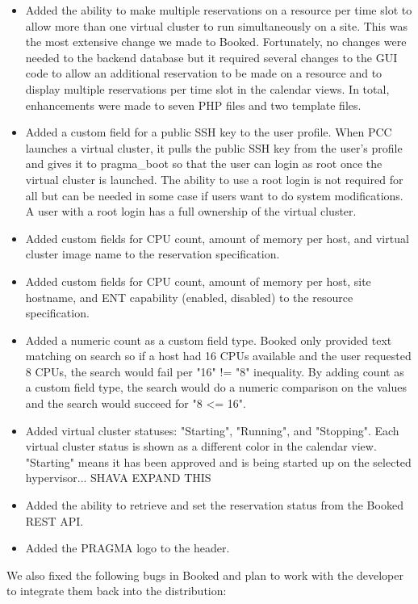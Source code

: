 \documentclass[times]{cpeauth}
\begin{document}
\begin{itemize}
\item Added the ability to make multiple reservations on a resource per time slot to allow more than one virtual cluster to run simultaneously on a site.   This was the most extensive change we made to Booked.  Fortunately, no changes were needed to the backend database but it required several changes to the GUI code to allow an additional reservation to be made on a resource and to display multiple reservations per time slot in the calendar views.  In total, enhancements were made to seven PHP files and two template files.
\item Added a custom field for a public SSH key  to the user profile.  When PCC launches a virtual cluster, it pulls the public SSH key from the user's  profile and gives it to pragma\_boot so that the user can login as root once the virtual cluster is launched.   The ability to use a root login is not required for all but can be needed in some case if users want to do system modifications. A user with a root login has a full ownership of the virtual cluster. 
\item Added custom fields for CPU count, amount of memory per host, and virtual cluster image name to the reservation specification.
\item Added custom fields for CPU count, amount of memory per host, site hostname, and ENT capability (enabled, disabled) to the resource specification.
\item Added a numeric count as a custom field type.  Booked only provided text matching on search so if a host had 16 CPUs available and the user requested 8 CPUs, the search would fail per "16" != "8" inequality.  By adding count as a custom field type, the search would do a numeric comparison on the values and the search would succeed for "8 \textless= 16".
\item Added virtual cluster statuses: "Starting", "Running", and "Stopping".  Each virtual cluster status is shown as a different color in  the calendar view.  "Starting" means it has been approved and is being started up on the selected hypervisor... SHAVA EXPAND THIS
\item Added the ability to retrieve and set the reservation status from the Booked REST API.  	
\item Added the PRAGMA logo to the header.
\end{itemize}

We also fixed the following bugs in Booked and plan to work with the developer to integrate them back into the distribution:
\end{document}
